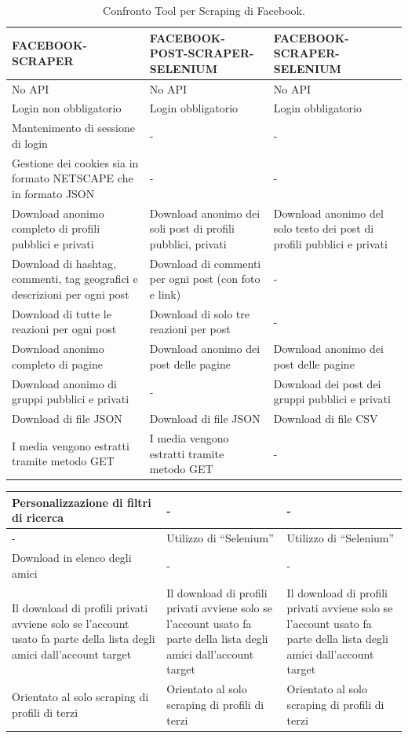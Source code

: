 \begin{table}[!htb]
\centering
\caption{Confronto Tool per Scraping di Facebook.}
\label{tabella_fb}
\begin{tabular}{|p{}|p{}|p{}|}
\hline
\textbf{FACEBOOK-SCRAPER} & \textbf{FACEBOOK-POST-SCRAPER-SELENIUM} & \textbf{FACEBOOK-SCRAPER-SELENIUM} \\\hline
 No API         &  No API                &   No API                        \\\hline
Login non obbligatorio &   Login obbligatorio & Login obbligatorio  \\\hline
Mantenimento di sessione di login & - & - \\\hline
Gestione dei cookies sia in formato NETSCAPE che in formato JSON & - & - \\\hline
Download anonimo completo di profili pubblici e privati & Download anonimo dei soli post di profili pubblici, privati & Download anonimo del solo testo dei post di profili pubblici e privati\\\hline
Download di hashtag, commenti, tag geografici e descrizioni per ogni post & Download di commenti per ogni post (con foto e link) & - \\\hline
Download di tutte le reazioni per ogni post & Download di solo tre reazioni per post & -\\\hline
Download anonimo completo di pagine & Download anonimo dei post delle pagine & Download anonimo dei post delle pagine \\\hline
Download anonimo di gruppi pubblici e privati & - & Download dei post dei gruppi pubblici e privati \\\hline
Download di file JSON & Download di file JSON & Download di file CSV\\\hline
I media vengono estratti tramite metodo GET & I media vengono estratti tramite metodo GET & -\\\hline
\end{tabular}
\end{table}
\begin{table}[!htb]
\begin{tabular}{|p{}|p{}|p{}|}
\hline
Personalizzazione di filtri di ricerca & - & -\\\hline
- & Utilizzo di ``Selenium'' & Utilizzo di ``Selenium'' \\\hline
Download in elenco degli amici & - & - \\\hline
Il download di profili privati avviene solo se l’account usato fa parte della lista degli amici dall’account target & Il download di profili privati avviene solo se l’account usato fa parte della lista degli amici dall’account target & Il download di profili privati avviene solo se l’account usato fa parte della lista degli amici dall’account target \\\hline
Orientato al solo scraping di profili di terzi & Orientato al solo scraping di profili di terzi & Orientato al solo scraping di profili di terzi \\\hline
\end{tabular}
\end{table}
\newpage


